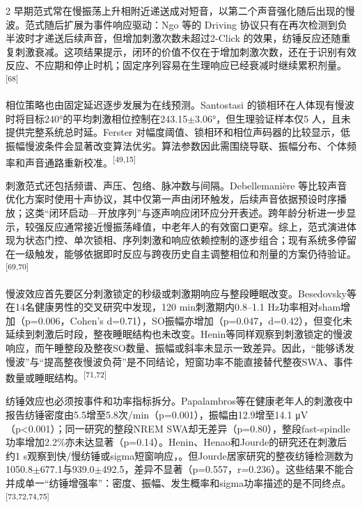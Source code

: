 \documentclass[UTF8,zihao=5,fontset=none]{ctexart}
\newcommand{\hei}{\CJKfamily{hei}}
\newcommand{\leveltwo}[1]{%
  \par\vspace{6pt}\noindent{\hei\fontsize{10pt}{16pt}\selectfont\bfseries #1\par}\vspace{2pt}}
\newcommand{\refcite}[1]{\nolinebreak[4]\textsuperscript{[#1]}}
\begin{document}
\begin{multicols}{2}
早期范式常在慢振荡上升相附近递送成对短音，以第二个声音强化随后出现的慢波。范式随后扩展为事件响应驱动：Ngo 等的 Driving 协议只有在再次检测到负半波时才递送后续声音，但增加刺激次数未超过2-Click 的效果，纺锤反应还随重复刺激衰减。这项结果提示，闭环的价值不仅在于增加刺激次数，还在于识别有效反应、不应期和停止时机；固定序列容易在生理响应已经衰减时继续累积剂量。\refcite{68}\par

相位策略也由固定延迟逐步发展为在线预测。Santostasi 的锁相环在人体现有慢波时将目标240°的平均刺激相位控制在243.15$\pm$3.06°，但生理验证样本仅5 人，且未提供完整系统总时延。Ferster 对幅度阈值、锁相环和相位声码器的比较显示，低振幅慢波条件会显著改变算法优劣。算法参数因此需围绕导联、振幅分布、个体频率和声音通路重新校准。\refcite{49,15}\par

刺激范式还包括频谱、声压、包络、脉冲数与间隔。Debellemanière 等比较声音优化方案时使用十声协议，其中仅第一声由闭环触发，后续声音依据预设时序播放；这类“闭环启动—开放序列”与逐声响应闭环应分开表述。跨年龄分析进一步显示，较强反应通常接近慢振荡峰值，中老年人的有效窗口更窄。综上，范式演进体现为状态门控、单次锁相、序列刺激和响应依赖控制的逐步组合；现有系统多停留在一级触发，能够依据即时反应与跨夜历史自主调整相位和剂量的方案仍待验证。\refcite{69,70}\par

\leveltwo{3.2 慢波与纺锤活动调制及其耦合的生理证据}

慢波效应首先要区分刺激锁定的秒级或刺激期响应与整段睡眠改变。Besedovsky等在14名健康男性的交叉研究中发现，120 min刺激期内0.8--1.1 Hz功率相对sham增加（p=0.006，Cohen's d=0.71），SO振幅亦增加（p=0.047，d=0.42），但变化未延续到刺激后时段，整夜睡眠结构也未改变。Henin等同样观察到刺激锁定的慢波响应，而午睡整段及整夜SO数量、振幅或斜率未显示一致差异。因此，“能够诱发慢波”与“提高整夜慢波负荷”是不同结论，短窗功率不能直接替代整夜SWA、事件数量或睡眠结构。\refcite{71,72}\par

纺锤效应也必须按事件和功率指标拆分。Papalambros等在健康老年人的刺激夜中报告纺锤密度由5.5增至5.8次/min（p=0.001），振幅由12.9增至14.1 μV（p<0.001）；同一研究的整段NREM SWA却无差异（p=0.80），整段fast-spindle功率增加2.2\%亦未达显著（p=0.14）。Henin、Henao和Jourde的研究还在刺激后约1 s观察到快/慢纺锤或sigma短窗响应，。但Jourde居家研究的整夜纺锤检测数为1050.8$\pm$677.1与939.0$\pm$492.5，差异不显著（p=0.557，r=0.236）。这些结果不能合并成单一“纺锤增强率”：密度、振幅、发生概率和sigma功率描述的是不同终点。\refcite{73,72,74,75}\par


\end{multicols}
\end{document}
